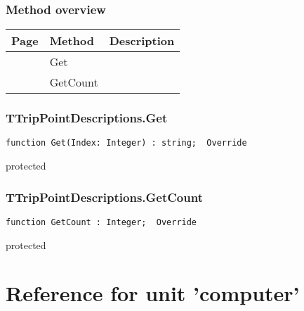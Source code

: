 \subsection{Method overview}
\label{computer:chiptemp:ttrippointdescriptions:methods}
\begin{tabularx}{\textwidth}{llX}
Page & Method & Description  \\ \hline
\pageref{computer:chiptemp:ttrippointdescriptions:get} & Get  &  \\
\pageref{computer:chiptemp:ttrippointdescriptions:getcount} & GetCount  &  \\
\hline
\end{tabularx}
\subsection{TTripPointDescriptions.Get}
\label{computer:chiptemp:ttrippointdescriptions:get}
\begin{FPCList}
\Declaration 

\begin{verbatim}
function Get(Index: Integer) : string;  Override
\end{verbatim}
\Visibility
protected
\end{FPCList}
\subsection{TTripPointDescriptions.GetCount}
\label{computer:chiptemp:ttrippointdescriptions:getcount}
\begin{FPCList}
\Declaration 

\begin{verbatim}
function GetCount : Integer;  Override
\end{verbatim}
\Visibility
protected
\end{FPCList}
\chapter{Reference for unit 'computer'}
\label{computer:computer}

